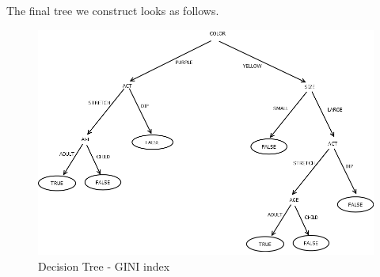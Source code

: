 \documentclass[fontsize=10pt]{scrartcl}
\begin{document}
\begin{enumerate}
            The final tree we construct looks as follows. \\
            \begin{figure}[H]
				\begin{center}
					\includegraphics[width=\textwidth]{resources/q2_img1.png}
					\caption{Decision Tree - GINI index}
				\end{center}
			\end{figure}
		\end{enumerate}
\end{document}
